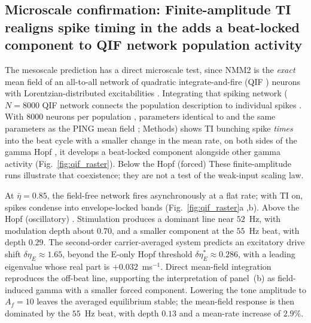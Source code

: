 \documentclass[11pt,a4paper]{article}
\providecommand{\DIFaddtex}[1]{{\protect\color{blue} \sf #1}} %
\providecommand{\DIFdeltex}[1]{{\protect\color{red} \scriptsize #1}} %
\providecommand{\DIFaddbegin}{} %
\providecommand{\DIFaddend}{} %
\providecommand{\DIFdelbegin}{} %
\providecommand{\DIFdelend}{} %
\providecommand{\DIFadd}[1]{\texorpdfstring{\DIFaddtex{#1}}{#1}} %
\providecommand{\DIFdel}[1]{\texorpdfstring{\DIFdeltex{#1}}{}} %
\begin{document}
\subsection{\DIFdelbegin \DIFdel{Microscale confirmation: }\DIFdelend \DIFaddbegin \DIFadd{Finite-amplitude }\DIFaddend TI \DIFdelbegin \DIFdel{realigns spike timing in the }\DIFdelend \DIFaddbegin \DIFadd{adds a beat-locked component to }\DIFaddend QIF \DIFdelbegin \DIFdel{network}\DIFdelend \DIFaddbegin \DIFadd{population activity}\DIFaddend }\label{sec:qif}
The \DIFdelbegin \DIFdel{mesoscale prediction has a direct microscale test, since NMM2 is the \emph{exact} mean
field of an all-to-all network of quadratic integrate-and-fire (QIF ) neurons with
Lorentzian-distributed excitabilities
\cite{montbrio2015,ruffini2025rosetta,clusella2023}. Integrating that spiking network
($N=8000$ }\DIFdelend \DIFaddbegin \DIFadd{QIF network connects the population description to individual spikes
\cite{montbrio2015,ruffini2025rosetta,clusella2023}. With $8000$ }\DIFaddend neurons per population
\DIFdelbegin \DIFdel{, parameters identical to }\DIFdelend \DIFaddbegin \DIFadd{and the same parameters as }\DIFaddend the PING mean field\DIFdelbegin \DIFdel{; Methods)
shows TI bunching spike \emph{times} into the beat cycle with a smaller change in the mean
rate, on both sides of the gamma Hopf }\DIFdelend \DIFaddbegin \DIFadd{, it develops a beat-locked component
alongside other gamma activity }\DIFaddend (Fig.~\ref{fig:qif_raster}). \DIFdelbegin \DIFdel{Below the Hopf (forced)
}\DIFdelend \DIFaddbegin \DIFadd{These finite-amplitude runs
illustrate that coexistence; they are not a test of the weak-input scaling law.
}

\DIFadd{At $\bar\eta=0.85$, }\DIFaddend the field-free network fires asynchronously\DIFdelbegin \DIFdel{at a flat rate; with TI on, spikes condense
into envelope-locked bands (Fig.~\ref{fig:qif_raster}a ,b). Above the Hopf (oscillatory) }\DIFdelend \DIFaddbegin \DIFadd{. Stimulation produces
a dominant line near $52$~Hz, with modulation depth about $0.70$, and a smaller component
at the $55$~Hz beat, with depth $0.29$. The second-order carrier-averaged system
predicts an excitatory drive shift $\delta\eta_E\approx1.65$, beyond the E-only
Hopf threshold $\delta\eta_E^*\approx0.286$, with a leading eigenvalue whose real
part is $+0.032$~ms$^{-1}$. Direct mean-field integration reproduces the off-beat
line, supporting the interpretation of panel~(b) as field-induced gamma with a
smaller forced component. Lowering the tone amplitude to $A_f=10$ leaves the
averaged equilibrium stable; the mean-field response is then dominated by the
$55$~Hz beat, with depth $0.13$ and a mean-rate increase of $2.9\%$.
}
\end{document}
